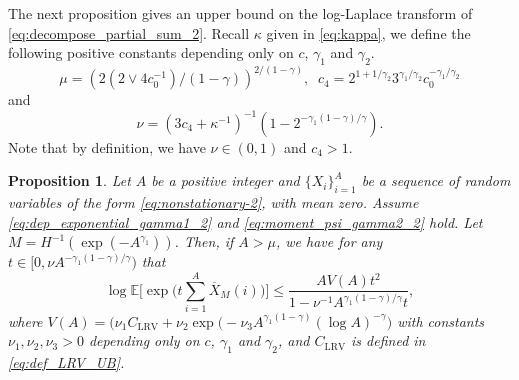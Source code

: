 \documentclass[11pt]{article}
\theoremstyle{plain}
\newtheorem{proposition}[theorem]{Proposition}
\theoremstyle{definition}
\begin{document}
The next proposition gives an upper bound on the log-Laplace transform of \eqref{eq:decompose_partial_sum_2}.
Recall $\kappa$ given in \eqref{eq:kappa}, we define the following positive constants depending only on $c$, $\gamma_1$ and $\gamma_2$.
\begin{equation}\label{eq:def_mu_c4}
    \mu = (2(2 \vee 4c_0^{-1})/(1-\gamma))^{2/(1-\gamma)}, \;\; c_4 = 2^{1+1/\gamma_2}3^{\gamma_1/\gamma_2}c_0^{-\gamma_1/\gamma_2}
\end{equation}
and
\begin{equation}\label{eq:def_nu}
    \nu = (3c_4 + \kappa^{-1})^{-1}(1 - 2^{-\gamma_1(1-\gamma)/\gamma}) .
\end{equation}
Note that by definition, we have $\nu \in (0,1)$ and $c_4 > 1$.

\begin{proposition}\label{prop:bernstein_bound_cantor_2}
    Let $A$ be a positive integer and $\{X_i\}_{i = 1}^A$ be a sequence of random variables of the form \eqref{eq:nonstationary-2}, with mean zero. Assume \eqref{eq:dep_exponential_gamma1_2} and \eqref{eq:moment_psi_gamma2_2} hold.
    Let $M = H^{-1}(\exp(-A^{\gamma_1}))$. Then, if $A > \mu$, we have for any $t \in [0,\nu A^{-\gamma_1(1-\gamma)/\gamma})$ that
\begin{equation*}
    \log\mathbb{E}\Big[\exp\Big(t\sum_{i = 1}^A\overline{X}_M(i)\Big)\Big] \leq \frac{AV(A)t^2}{1-\nu^{-1}A^{\gamma_1(1-\gamma)/\gamma}t},
\end{equation*}
where $V(A) = (\nu_1 C_{\mathrm{LRV}} + \nu_2\exp\big(-\nu_3A^{\gamma_1(1-\gamma)}(\log A)^{-\gamma}\big)$ with constants $\nu_1, \nu_2, \nu_3 > 0$ depending only on $c$, $\gamma_1$ and $\gamma_2$, and $C_{\mathrm{LRV}}$ is defined in \eqref{eq:def_LRV_UB}.
\end{proposition} 
\end{document}
